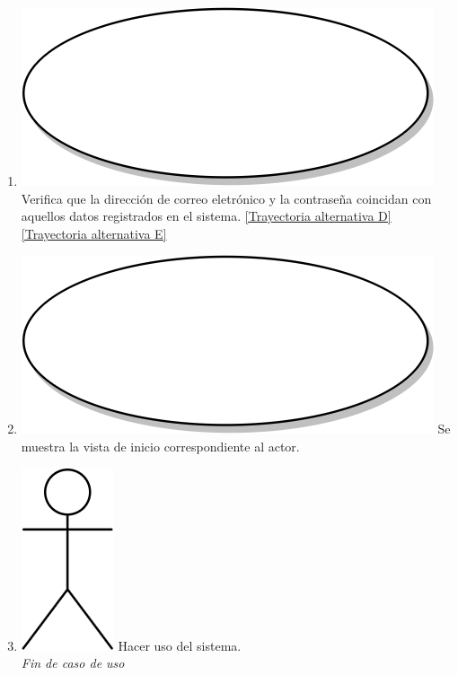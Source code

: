 \begin{enumerate}
  \item {\includegraphics[scale=.05]{Capitulo3/img/proceso.png} Verifica que la dirección de correo eletrónico y la contraseña coincidan con aquellos datos registrados en el sistema. \hyperref[cu1_ta_d]{[Trayectoria alternativa D]} \hyperref[cu1_ta_e]{[Trayectoria alternativa E]}}
  \item {\includegraphics[scale=.05]{Capitulo3/img/proceso.png} Se muestra la vista de inicio correspondiente al actor.}
  \item {\includegraphics[scale=.1]{Capitulo3/img/actor.png} Hacer uso del sistema.}\\
  \textit{Fin de caso de uso} \\	
\end{enumerate}


